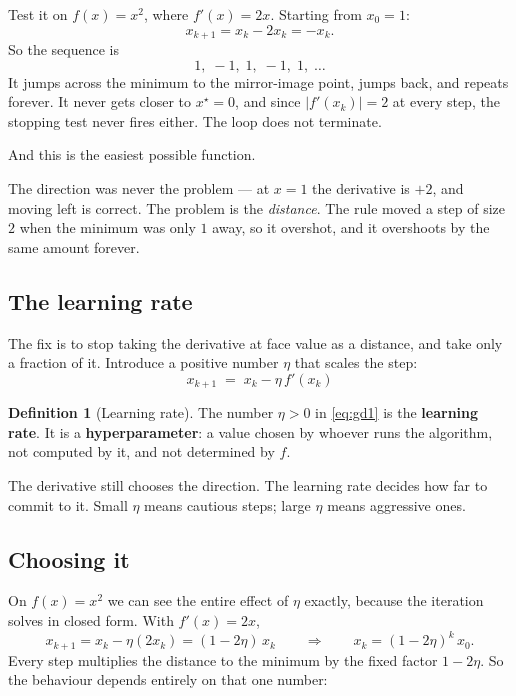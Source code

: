 \documentclass[11pt]{article}
\theoremstyle{plain}
\theoremstyle{definition}
\newtheorem{defn}{Definition}[section]
\theoremstyle{remark}
\newcommand{\lr}{\eta}
\begin{document}
Test it on $f(x)=x^{2}$, where $f'(x)=2x$. Starting from $x_0=1$:
\[
  x_{k+1} = x_k - 2x_k = -x_k .
\]
So the sequence is
\[
  1,\; -1,\; 1,\; -1,\; 1,\; \dots
\]
It jumps across the minimum to the mirror-image point, jumps back, and repeats
forever. It never gets closer to $x^{\star}=0$, and since $|f'(x_k)|=2$ at every
step, the stopping test never fires either. The loop does not terminate.

And this is the easiest possible function.

The direction was never the problem --- at $x=1$ the derivative is $+2$, and
moving left is correct. The problem is the \emph{distance}. The rule moved a
step of size $2$ when the minimum was only $1$ away, so it overshot, and it
overshoots by the same amount forever.

\subsection{The learning rate}
The fix is to stop taking the derivative at face value as a distance, and take
only a fraction of it. Introduce a positive number $\lr$ that scales the step:
\begin{equation}\label{eq:gd1}
  \boxed{\;x_{k+1} \;=\; x_k - \lr\,f'(x_k)\;}
\end{equation}

\begin{defn}[Learning rate]
The number $\lr>0$ in \eqref{eq:gd1} is the \textbf{learning rate}. It is a
\textbf{hyperparameter}: a value chosen by whoever runs the algorithm, not
computed by it, and not determined by $f$.
\end{defn}

\noindent The derivative still chooses the direction. The learning rate decides
how far to commit to it. Small $\lr$ means cautious steps; large $\lr$ means
aggressive ones.

\subsection{Choosing it}
On $f(x)=x^{2}$ we can see the entire effect of $\lr$ exactly, because the
iteration solves in closed form. With $f'(x)=2x$,
\[
  x_{k+1} = x_k - \lr(2x_k) = (1-2\lr)\,x_k
  \qquad\Longrightarrow\qquad
  x_k = (1-2\lr)^{k}\,x_0 .
\]
Every step multiplies the distance to the minimum by the fixed factor
$1-2\lr$. So the behaviour depends entirely on that one number:
\end{document}
